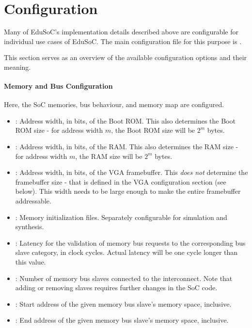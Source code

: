 \newpage
\section{Configuration}\label{sec:config}
Many of EduSoC's implementation details described above are configurable for individual use cases of EduSoC. The main configuration file for this purpose is .

This section serves as an overview of the available configuration options and their meaning.

\paragraph{Memory and Bus Configuration}
Here, the SoC memories, bus behaviour, and memory map are configured.
\begin{itemize}
    \item {}: Address width, in bits, of the Boot ROM. This also determines the Boot ROM size - for address width $m$, the Boot ROM size will be $2^m$ bytes.
    \item {}: Address width, in bits, of the RAM. This also determines the RAM size - for address width $m$, the RAM size will be $2^m$ bytes.
    \item {}: Address width, in bits, of the VGA framebuffer. This \textit{does not} determine the framebuffer size - that is defined in the VGA configuration section (see below). This width needs to be large enough to make the entire framebuffer addressable.
    \item {}: Memory initialization files. Separately configurable for simulation and synthesis.
    \item {}: Latency for the validation of memory bus requests to the corresponding bus slave category, in clock cycles. Actual latency will be one cycle longer than this value.
    \item {}: Number of memory bus slaves connected to the interconnect. Note that adding or removing slaves requires further changes in the SoC code.
    \item {}: Start address of the given memory bus slave's memory space, inclusive.
    \item {}: End address of the given memory bus slave's memory space, inclusive.
\end{itemize}

